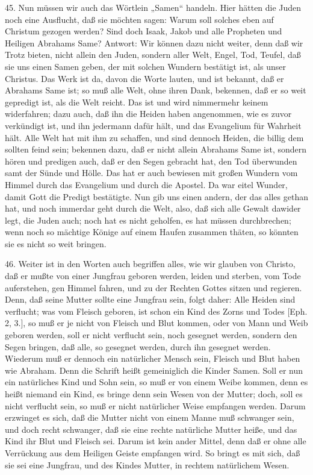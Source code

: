 45. Nun müssen wir auch das Wörtlein „Samen“ handeln. Hier hätten die Juden noch eine Ausflucht, daß sie möchten sagen: Warum soll solches eben auf Christum gezogen werden? Sind doch Isaak, Jakob und alle Propheten und Heiligen Abrahams Same? Antwort: Wir können dazu nicht weiter, denn daß wir Trotz bieten, nicht allein den Juden, sondern aller Welt, Engel, Tod, Teufel, daß sie uns einen Samen geben, der mit solchen Wundern bestätigt ist, als unser Christus. Das Werk ist da, davon die Worte lauten, und ist bekannt, daß er Abrahams Same ist; so muß alle Welt, ohne ihren Dank, bekennen, daß er so weit gepredigt ist, als die Welt reicht. Das ist und wird nimmermehr keinem widerfahren; dazu auch, daß ihn die Heiden haben angenommen, wie es zuvor verkündigt ist, und ihn jedermann dafür hält, und das Evangelium für Wahrheit hält. Alle Welt hat mit ihm zu schaffen, und sind dennoch Heiden, die billig dem sollten feind sein; bekennen dazu, daß er nicht allein Abrahams Same ist, sondern hören und predigen auch, daß er den Segen gebracht hat, den Tod überwunden samt der Sünde und Hölle. Das hat er auch bewiesen mit großen Wundern vom Himmel durch das Evangelium und durch die Apostel. Da war eitel Wunder, damit Gott die Predigt bestätigte. Nun gib uns einen andern, der das alles gethan hat, und noch immerdar geht durch die Welt, also, daß sich alle Gewalt dawider legt, die Juden auch; noch hat es nicht geholfen, es hat müssen durchbrechen; wenn noch so mächtige Könige auf einem Haufen zusammen thäten, so könnten sie es nicht so weit bringen.

46. Weiter ist in den Worten auch begriffen alles, wie wir glauben von Christo, daß er mußte von einer Jungfrau geboren werden, leiden und sterben, vom Tode auferstehen, gen Himmel fahren, und zu der Rechten Gottes sitzen und regieren. Denn, daß seine Mutter sollte eine Jungfrau sein, folgt daher: Alle Heiden sind verflucht; was vom Fleisch geboren, ist schon ein Kind des Zorns und Todes [Eph. 2, 3.], so muß er je nicht von Fleisch und Blut kommen, oder von Mann und Weib geboren werden, soll er nicht verflucht sein, noch gesegnet werden, sondern den Segen bringen, daß alle, so gesegnet werden, durch ihn gesegnet werden. Wiederum muß er dennoch ein natürlicher Mensch sein, Fleisch und Blut haben wie Abraham. Denn die Schrift heißt gemeiniglich die Kinder Samen. Soll er nun ein natürliches Kind und Sohn sein, so muß er von einem Weibe kommen, denn es heißt niemand ein Kind, es bringe denn sein Wesen von der Mutter; doch, soll es nicht verflucht sein, so muß er nicht natürlicher Weise empfangen werden. Darum erzwinget es sich, daß die Mutter nicht von einem Manne muß schwanger sein, und doch recht schwanger, daß sie eine rechte natürliche Mutter heiße, und das Kind ihr Blut und Fleisch sei. Darum ist kein ander Mittel, denn daß er ohne alle Verrückung aus dem Heiligen Geiste empfangen wird. So bringt es mit sich, daß sie sei eine Jungfrau, und des Kindes Mutter, in rechtem natürlichem Wesen.

